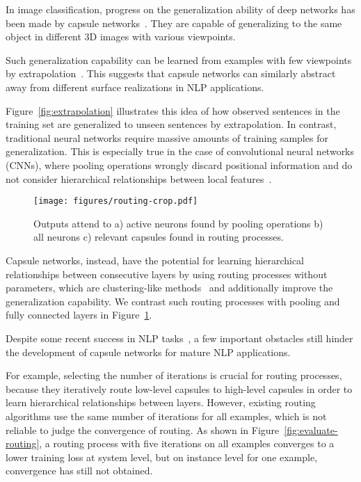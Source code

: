 \documentclass[11pt,a4paper]{article}
\newcommand{\1}{\boldsymbol{1}}
\begin{document}
In image classification, progress on the generalization ability of 
deep networks 
has been made by 
capsule networks~\cite{sabour2017dynamic,hinton2018matrix}. They are capable of generalizing to the same object in different 3D images with various viewpoints.



Such generalization capability can be learned from examples with few viewpoints by extrapolation~\cite{hinton2011transforming}.
This suggests that capsule networks can similarly abstract away from different surface realizations in NLP applications. 


Figure~\ref{fig:extrapolation} illustrates this idea of 
how observed sentences in the training set are generalized to unseen sentences by extrapolation.
In contrast, traditional neural networks require massive amounts of training samples for generalization. This is especially true in the case of convolutional neural networks (CNNs), 
where pooling operations
wrongly discard positional information and do not consider hierarchical relationships between local features~\citep{sabour2017dynamic}.



\begin{figure}[b]
\centering
\texttt{[image: figures/routing-crop.pdf]}
\caption{Outputs attend to a) active neurons found by pooling operations b) all neurons c) relevant capsules found in routing processes.
}
\label{fig:layers-comparision}
\vspace{-0.1in}
\end{figure}

Capsule networks, instead, have the potential for learning hierarchical relationships between consecutive layers by using routing processes without parameters, which are clustering-like methods~\cite{sabour2017dynamic} and additionally
improve the generalization capability. We contrast such routing processes with pooling and fully connected layers in Figure~\ref{fig:layers-comparision}. 


Despite some recent success in NLP tasks~\cite{wang2018towards,xia2018zero,xiao2018mcapsnet,zhang2018attention,zhao2018investigating}, a few important 
obstacles still hinder the development of capsule networks for mature NLP applications.


For example, selecting the number of iterations is crucial for routing processes, because they iteratively route low-level capsules to high-level capsules in order to learn hierarchical relationships between layers. However, existing routing algorithms use the same number of iterations for all examples, which is not 
reliable to judge the convergence of routing.
As shown in Figure~\ref{fig:evaluate-routing}, a routing process with five iterations on all examples converges to a lower training loss at system level, but 
on instance level for one example, convergence has still not obtained. 
\end{document}
